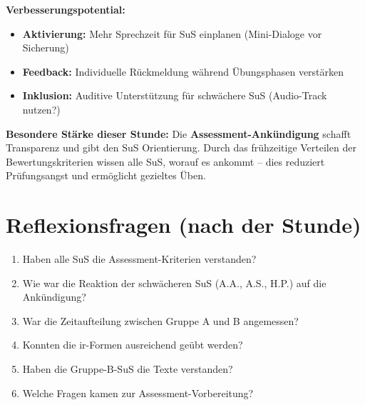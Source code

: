 \documentclass[11pt,a4paper]{article}
\begin{document}
\begin{scorebox}
\textbf{Verbesserungspotential:}
\begin{itemize}
    \item[$\Box$] \textbf{Aktivierung:} Mehr Sprechzeit für SuS einplanen (Mini-Dialoge vor Sicherung)
    \item[$\Box$] \textbf{Feedback:} Individuelle Rückmeldung während Übungsphasen verstärken
    \item[$\Box$] \textbf{Inklusion:} Auditive Unterstützung für schwächere SuS (Audio-Track nutzen?)
\end{itemize}

\vspace{1em}
\textbf{Besondere Stärke dieser Stunde:} Die \textbf{Assessment-Ankündigung} schafft Transparenz und gibt den SuS Orientierung. Durch das frühzeitige Verteilen der Bewertungskriterien wissen alle SuS, worauf es ankommt -- dies reduziert Prüfungsangst und ermöglicht gezieltes Üben.
\end{scorebox}

\section{Reflexionsfragen (nach der Stunde)}

\begin{enumerate}
    \item Haben alle SuS die Assessment-Kriterien verstanden?
    \item Wie war die Reaktion der schwächeren SuS (A.A., A.S., H.P.) auf die Ankündigung?
    \item War die Zeitaufteilung zwischen Gruppe A und B angemessen?
    \item Konnten die ir-Formen ausreichend geübt werden?
    \item Haben die Gruppe-B-SuS die Texte verstanden?
    \item Welche Fragen kamen zur Assessment-Vorbereitung?
\end{enumerate}
\end{document}

